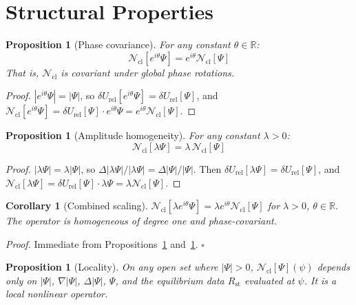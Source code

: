 \documentclass[12pt]{article}
\newtheorem{proposition}[theorem]{Proposition}
\newtheorem{corollary}[theorem]{Corollary}
\newcommand{\Ncl}{\mathcal{N}_{\mathrm{cl}}}
\newcommand{\Rst}{R_{\mathrm{st}}}
\newcommand{\dUrel}{\delta U_{\mathrm{rel}}}
\begin{document}
\section{Structural Properties}\label{sec:structure}

\begin{proposition}[Phase covariance]\label{prop:covariance}
For any constant $\theta \in \mathbb{R}$:
\begin{equation}
    \Ncl[e^{i\theta}\Psi] = e^{i\theta}\Ncl[\Psi]
\end{equation}
That is, $\Ncl$ is covariant under global phase rotations.
\end{proposition}

\begin{proof}
$|e^{i\theta}\Psi| = |\Psi|$, so $\dUrel[e^{i\theta}\Psi] = \dUrel[\Psi]$, and $\Ncl[e^{i\theta}\Psi] = \dUrel[\Psi]\cdot e^{i\theta}\Psi = e^{i\theta}\Ncl[\Psi]$.
\end{proof}

\begin{proposition}[Amplitude homogeneity]\label{prop:homogeneity}
For any constant $\lambda > 0$:
\begin{equation}
    \Ncl[\lambda\Psi] = \lambda\,\Ncl[\Psi]
\end{equation}
\end{proposition}

\begin{proof}
$|\lambda\Psi| = \lambda|\Psi|$, so $\Delta|\lambda\Psi|/|\lambda\Psi| = \Delta|\Psi|/|\Psi|$. Then $\dUrel[\lambda\Psi] = \dUrel[\Psi]$, and $\Ncl[\lambda\Psi] = \dUrel[\Psi]\cdot\lambda\Psi = \lambda\Ncl[\Psi]$.
\end{proof}

\begin{corollary}[Combined scaling]
$\Ncl[\lambda e^{i\theta}\Psi] = \lambda e^{i\theta}\Ncl[\Psi]$ for $\lambda > 0$, $\theta \in \mathbb{R}$. The operator is homogeneous of degree one and phase-covariant.
\end{corollary}

\noindent\textit{Proof.} Immediate from Propositions~\ref{prop:covariance} and~\ref{prop:homogeneity}. \hfill$\square$

\begin{proposition}[Locality]\label{prop:locality}
On any open set where $|\Psi| > 0$, $\Ncl[\Psi](\psi)$ depends only on $|\Psi|$, $\nabla|\Psi|$, $\Delta|\Psi|$, $\Psi$, and the equilibrium data $\Rst$ evaluated at $\psi$. It is a local nonlinear operator.
\end{proposition}
\end{document}

